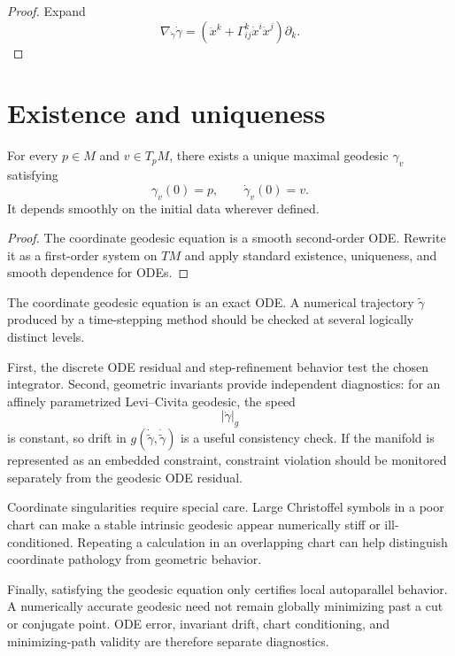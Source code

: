 \begin{proof}
Expand
\[
\nabla_{\dot\gamma}\dot\gamma
=
\left(
\ddot x^k+\Gamma^k_{ij}\dot x^i\dot x^j
\right)\partial_k.
\]
\end{proof}

\section{Existence and uniqueness}

\begin{theorem}\label{thm:vii23-ivp}
For every \(p\in M\) and \(v\in T_pM\), there exists a unique maximal geodesic
\(\gamma_v\) satisfying
\[
\gamma_v(0)=p,
\qquad
\dot\gamma_v(0)=v.
\]
It depends smoothly on the initial data wherever defined.
\end{theorem}

\begin{proof}
The coordinate geodesic equation is a smooth second-order ODE.  Rewrite it as a
first-order system on \(TM\) and apply standard existence, uniqueness, and smooth
dependence for ODEs.
\end{proof}

\begin{remark}
The coordinate geodesic equation is an exact ODE.  A numerical trajectory
\(\widetilde\gamma\) produced by a time-stepping method should be checked at
several logically distinct levels.

First, the discrete ODE residual and step-refinement behavior test the chosen
integrator.  Second, geometric invariants provide independent diagnostics:
for an affinely parametrized Levi--Civita geodesic, the speed
\[
|\dot\gamma|_g
\]
is constant, so drift in \(g(\dot{\widetilde\gamma},
\dot{\widetilde\gamma})\) is a useful consistency check.  If the manifold is
represented as an embedded constraint, constraint violation should be monitored
separately from the geodesic ODE residual.

Coordinate singularities require special care.  Large Christoffel symbols in a
poor chart can make a stable intrinsic geodesic appear numerically stiff or
ill-conditioned.  Repeating a calculation in an overlapping chart can help
distinguish coordinate pathology from geometric behavior.

Finally, satisfying the geodesic equation only certifies local autoparallel
behavior.  A numerically accurate geodesic need not remain globally minimizing
past a cut or conjugate point.  ODE error, invariant drift, chart conditioning,
and minimizing-path validity are therefore separate diagnostics.
\end{remark}


